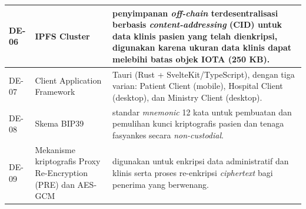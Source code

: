 \begin{xltabular}{\textwidth}{|>{\centering\arraybackslash}p{1.2cm}|>{\raggedright\arraybackslash}p{4.5cm}|X|}
    DE-06 & IPFS Cluster & penyimpanan \textit{off-chain} terdesentralisasi berbasis \textit{content-addressing} (CID) untuk data klinis pasien yang telah dienkripsi, digunakan karena ukuran data klinis dapat melebihi batas objek IOTA (250 KB). \\
    \hline

    DE-07 & Client Application Framework & Tauri (Rust + SvelteKit/TypeScript), dengan tiga varian: Patient Client (mobile), Hospital Client (desktop), dan Ministry Client (desktop). \\
    \hline

    DE-08 & Skema BIP39 & standar \textit{mnemonic} 12 kata untuk pembuatan dan pemulihan kunci kriptografis pasien dan tenaga fasyankes secara \textit{non-custodial}. \\
    \hline

    DE-09 & Mekanisme kriptografis Proxy Re-Encryption (PRE) dan AES-GCM & digunakan untuk enkripsi data administratif dan klinis serta proses re-enkripsi \textit{ciphertext} bagi penerima yang berwenang. \\
    \hline

\end{xltabular}

